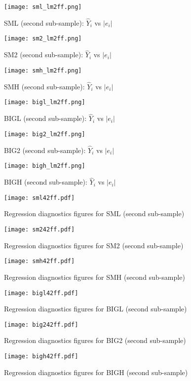 \documentclass[11pt]{article}
\begin{document}
\begin{figure}
\centering
\texttt{[image: sml\_lm2ff.png]}
\caption{SML (second sub-sample): $\hat{Y}_i$ vs $|e_i|$}
\label{smllm2ff}
\texttt{[image: sm2\_lm2ff.png]}
\caption{SM2 (second sub-sample): $\hat{Y}_i$ vs $|e_i|$}
\label{sm2lm2ff}
\end{figure}
\begin{figure}
\centering
\texttt{[image: smh\_lm2ff.png]}
\caption{SMH (second sub-sample): $\hat{Y}_i$ vs $|e_i|$}
\label{smhlm2ff}
\texttt{[image: bigl\_lm2ff.png]}
\caption{BIGL (second sub-sample): $\hat{Y}_i$ vs $|e_i|$}
\label{bigllm2ff}
\end{figure}
\begin{figure}
\centering
\texttt{[image: big2\_lm2ff.png]}
\caption{BIG2 (second sub-sample): $\hat{Y}_i$ vs $|e_i|$}
\label{big2lm2ff}
\texttt{[image: bigh\_lm2ff.png]}
\caption{BIGH (second sub-sample): $\hat{Y}_i$ vs $|e_i|$}
\label{bighlm2ff}
\end{figure}

\begin{figure}
\texttt{[image: sml42ff.pdf]}
\caption{Regression diagnostics figures for SML (second sub-sample)}
\label{sml42ff}
\end{figure}
\begin{figure}
\texttt{[image: sm242ff.pdf]}
\caption{Regression diagnostics figures for SM2 (second sub-sample)}
\label{sm242ff}
\end{figure}
\begin{figure}
\texttt{[image: smh42ff.pdf]}
\caption{Regression diagnostics figures for SMH (second sub-sample)}
\label{smh42ff}
\end{figure}
\begin{figure}
\texttt{[image: bigl42ff.pdf]}
\caption{Regression diagnostics figures for BIGL (second sub-sample)}
\label{bigl42ff}
\end{figure}
\FloatBarrier
\begin{figure}
\texttt{[image: big242ff.pdf]}
\caption{Regression diagnostics figures for BIG2 (second sub-sample)}
\label{big242ff}
\end{figure}
\begin{figure}
\centering
\texttt{[image: bigh42ff.pdf]}
\caption{Regression diagnostics figures for BIGH (second sub-sample)}
\label{bigh42ff}
\end{figure}
\end{document}
